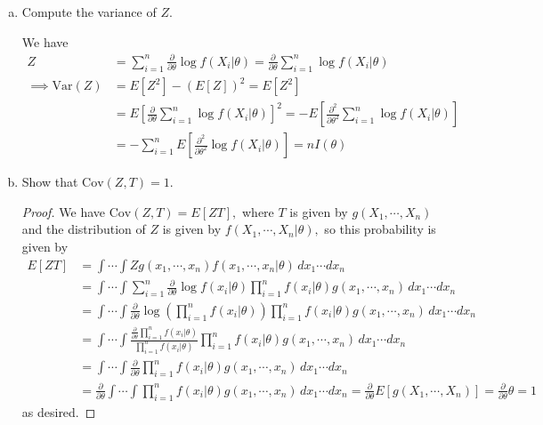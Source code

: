 \documentclass{article}
\newcommand{\var}{\mathrm{Var}}
\newcommand{\cov}{\mathrm{Cov}}
\begin{document}
\begin{enumerate}
\begin{enumerate}[(a)]
\begin{proof}
				\end{proof}

			\item Compute the variance of $Z.$ 
				\begin{soln}
					We have 
					\begin{align*}
						Z&=\sum_{i=1}^{n}\frac{\partial}{\partial\theta}\log f(X_i|\theta)=\frac{\partial}{\partial\theta}\sum_{i=1}^{n}\log f(X_i|\theta) \\
						\implies \var(Z) &= E[Z^2]-(E[Z])^2 = E[Z^2] \\
						&= E\left[ \frac{\partial}{\partial\theta}\sum_{i=1}^{n} \log f(X_i|\theta) \right]^2 = -E\left[ \frac{\partial^2}{\partial\theta^2}\sum_{i=1}^{n}\log f(X_i|\theta)\right] \\
						&= -\sum_{i=1}^{n} E\left[ \frac{\partial^2}{\partial\theta^2}\log f(X_i|\theta) \right] = nI(\theta)
					\end{align*} 
					
				\end{soln}

			\item Show that $\cov(Z, T)=1.$ 
				\begin{proof}
					We have $\cov(Z, T)=E[ZT],$ where $T$ is given by $g(X_1, \cdots, X_n)$ and the distribution of $Z$ is given by $f(X_1, \cdots, X_n|\theta),$ so this probability is given by 
					\begin{align*}
						E[ZT] &= \int\cdots\int Zg(x_1, \cdots, x_n) f(x_1, \cdots, x_n|\theta)\, dx_1\cdots dx_n \\
						&= \int\cdots\int \sum_{i=1}^{n}\frac{\partial}{\partial\theta}\log f(x_i|\theta) \prod_{i=1}^n f(x_i|\theta) g(x_1, \cdots, x_n)\, dx_1\cdots dx_n \\
						&= \int\cdots\int \frac{\partial}{\partial\theta}\log\left( \prod_{i=1}^n f(x_i|\theta) \right)\prod_{i=1}^n f(x_i|\theta) g(x_1, \cdots, x_n)\, dx_1\cdots dx_n \\
						&= \int\cdots\int \frac{\frac{\partial}{\partial\theta}\prod_{i=1}^n f(x_i|\theta)}{\prod_{i=1}^n f(x_i|\theta)}\prod_{i=1}^n f(x_i|\theta) g(x_1, \cdots, x_n)\, dx_1\cdots dx_n \\
						&= \int\cdots\int \frac{\partial}{\partial\theta}\prod_{i=1}^{n} f(x_i|\theta) g(x_1, \cdots, x_n)\, dx_1\cdots dx_n \\
						&= \frac{\partial}{\partial\theta}\int\cdots\int \prod_{i=1}^{n}f(x_i|\theta)g(x_1, \cdots, x_n)\, dx_1\cdots dx_n = \frac{\partial}{\partial\theta} E[g(X_1, \cdots, X_n)] = \frac{\partial}{\partial\theta}\theta = 1
					\end{align*} as desired.


\end{proof}
\end{enumerate}
\end{enumerate}
\end{document}
